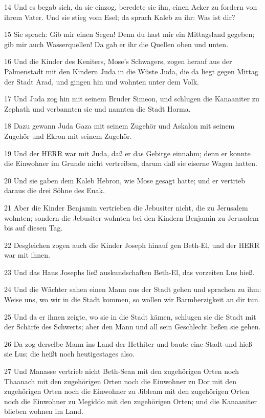 \par 14 Und es begab sich, da sie einzog, beredete sie ihn, einen Acker zu fordern von ihrem Vater. Und sie stieg vom Esel; da sprach Kaleb zu ihr: Was ist dir?
\par 15 Sie sprach: Gib mir einen Segen! Denn du hast mir ein Mittagsland gegeben; gib mir auch Wasserquellen! Da gab er ihr die Quellen oben und unten.
\par 16 Und die Kinder des Keniters, Mose's Schwagers, zogen herauf aus der Palmenstadt mit den Kindern Juda in die Wüste Juda, die da liegt gegen Mittag der Stadt Arad, und gingen hin und wohnten unter dem Volk.
\par 17 Und Juda zog hin mit seinem Bruder Simeon, und schlugen die Kanaaniter zu Zephath und verbannten sie und nannten die Stadt Horma.
\par 18 Dazu gewann Juda Gaza mit seinem Zugehör und Askalon mit seinem Zugehör und Ekron mit seinem Zugehör.
\par 19 Und der HERR war mit Juda, daß er das Gebirge einnahm; denn er konnte die Einwohner im Grunde nicht vertreiben, darum daß sie eiserne Wagen hatten.
\par 20 Und sie gaben dem Kaleb Hebron, wie Mose gesagt hatte; und er vertrieb daraus die drei Söhne des Enak.
\par 21 Aber die Kinder Benjamin vertrieben die Jebusiter nicht, die zu Jerusalem wohnten; sondern die Jebusiter wohnten bei den Kindern Benjamin zu Jerusalem bis auf diesen Tag.
\par 22 Desgleichen zogen auch die Kinder Joseph hinauf gen Beth-El, und der HERR war mit ihnen.
\par 23 Und das Haus Josephs ließ auskundschaften Beth-El, das vorzeiten Lus hieß.
\par 24 Und die Wächter sahen einen Mann aus der Stadt gehen und sprachen zu ihm: Weise uns, wo wir in die Stadt kommen, so wollen wir Barmherzigkeit an dir tun.
\par 25 Und da er ihnen zeigte, wo sie in die Stadt kämen, schlugen sie die Stadt mit der Schärfe des Schwerts; aber den Mann und all sein Geschlecht ließen sie gehen.
\par 26 Da zog derselbe Mann ins Land der Hethiter und baute eine Stadt und hieß sie Lus; die heißt noch heutigestages also.
\par 27 Und Manasse vertrieb nicht Beth-Sean mit den zugehörigen Orten noch Thaanach mit den zugehörigen Orten noch die Einwohner zu Dor mit den zugehörigen Orten noch die Einwohner zu Jibleam mit den zugehörigen Orten noch die Einwohner zu Megiddo mit den zugehörigen Orten; und die Kanaaniter blieben wohnen im Land.
